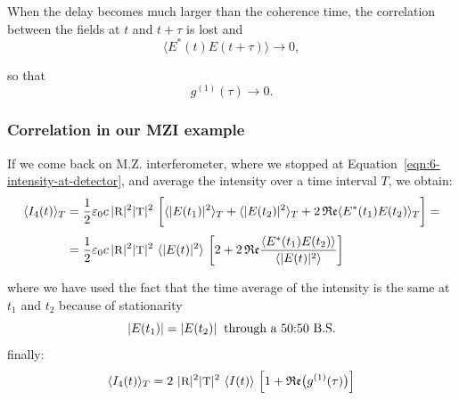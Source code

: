 When the delay becomes much larger than the coherence time, the correlation between the fields at $t$ and $t+\tau$ is lost and
\[
\langle E^*(t)E(t+\tau)\rangle \to 0,
\]

so that
\[
g^{(1)}(\tau)\to 0.
\]


\subsubsection{Correlation in our MZI example}

If we come back on M.Z. interferometer, where we stopped at Equation~\ref{eqn:6-intensity-at-detector}, and average the intensity over a time interval $T$, we obtain:
\[
\begin{split}
    \langle I_4(t)\rangle_T &= 
    \frac{1}{2}\varepsilon_0c\, |\refl|^2|\tran|^2\ 
    \biggl[
        \langle |E(t_1)|^2\rangle_T + \langle |E(t_2)|^2\rangle_T + 
        2\,\Re \langle E^*(t_1)E(t_2)\rangle_T
    \biggr] =\\[0.75ex]
    &= \frac{1}{2}\varepsilon_0c\, |\refl|^2|\tran|^2\ 
    \langle |E(t)|^2\rangle\,
    \left[2+2\,\Re\frac{\langle E^*(t_1)E(t_2)\rangle}{\langle |E(t)|^2\rangle}\right]
\end{split}
\]  

where we have used the fact that the time average of the intensity is the same at $t_1$ and $t_2$ because of stationarity
\begin{equation*}
|E(t_1)| = |E(t_2)| \hspace{0.2cm}\text{through a 50:50 B.S.}
\end{equation*}
finally:
\begin{equation}\label{eqn:6-intensity-at-detector-final}
\langle I_4(t)\rangle_T =
 2\ |\textsc{\small{R}}|^2|\textsc{\small{T}}|^2\ \langle I(t)\rangle\,
\left[
    1+\mathfrak{Re}\bigl(g^{(1)}(\tau)\bigr)
\right]
\end{equation}

